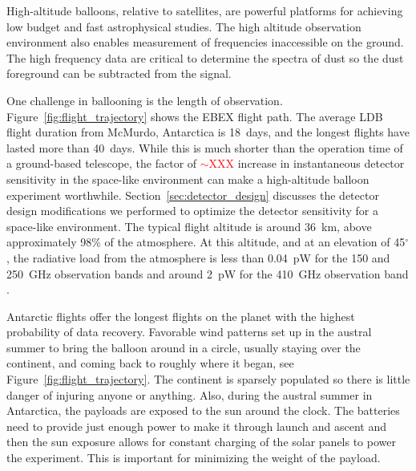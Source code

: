 
High-altitude balloons, relative to satellites, are powerful platforms for achieving low budget and fast astrophysical studies. 
The high altitude observation environment also enables measurement of frequencies inaccessible on the ground. 
The high frequency data are critical to determine the spectra of dust so the dust foreground can be subtracted from the signal. 

One challenge in ballooning is the length of observation. 
Figure~\ref{fig:flight_trajectory} shows the \ac{EBEX} flight path. 
The average \ac{LDB} flight duration from McMurdo, Antarctica is 18~days, and the longest flights have lasted more than 40~days.  
While this is much shorter than the operation time of a ground-based telescope, the factor of \textcolor{red}{$\sim$XXX} increase in instantaneous detector sensitivity in the space-like environment can make a high-altitude balloon experiment worthwhile. 
Section~\ref{sec:detector_design} discusses the detector design modifications we performed to optimize the detector sensitivity for a space-like environment. 
The typical flight altitude is around 36~km, above approximately 98\% of the atmosphere. 
At this altitude, and at an elevation of 45$^\circ$, the radiative load from the atmosphere is less than 0.04~pW for the 150 and 250~GHz observation bands and around 2~pW for the 410~GHz observation band \cite{Bao2015}. 


Antarctic flights offer the longest flights on the planet with the highest probability of data recovery. 
Favorable wind patterns set up in the austral summer to bring the balloon around in a circle, usually staying over the continent, and coming back to roughly where it began, see Figure~\ref{fig:flight_trajectory}. 
The continent is sparsely populated so there is little danger of injuring anyone or anything. 
Also, during the austral summer in Antarctica, the payloads are exposed to the sun around the clock. 
The batteries need to provide just enough power to make it through launch and ascent and then the sun exposure allows for constant charging of the solar panels to power the experiment. 
This is important for minimizing the weight of the payload. 


